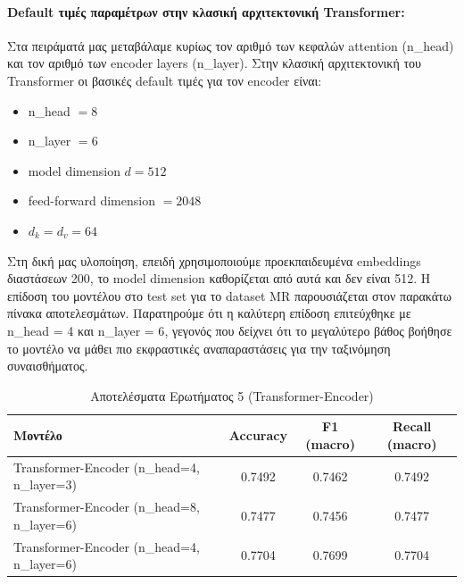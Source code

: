 \documentclass[11pt,a4paper]{article}
\begin{document}
\paragraph{\textlatin{Default} τιμές παραμέτρων στην κλασική αρχιτεκτονική \textlatin{Transformer}:}

Στα πειράματά μας μεταβάλαμε κυρίως τον αριθμό των κεφαλών \textlatin{attention} (\textlatin{n\_head}) και τον αριθμό των \textlatin{encoder layers} 
(\textlatin{n\_layer}). Στην κλασική αρχιτεκτονική του \textlatin{Transformer} οι βασικές \textlatin{default} τιμές 
για τον \textlatin{encoder} είναι:
\begin{itemize}
  \item \textlatin{n\_head} \(= 8\)
  \item \textlatin{n\_layer} \(= 6\)
  \item \textlatin{model dimension} \(d = 512\)
  \item \textlatin{feed-forward dimension} \(= 2048\)
  \item \(d_k = d_v = 64\)
\end{itemize}

Στη δική μας υλοποίηση, επειδή χρησιμοποιούμε προεκπαιδευμένα \textlatin{embeddings} διαστάσεων 200, το \textlatin{model dimension} καθορίζεται 
από αυτά και δεν είναι 512. Η επίδοση του μοντέλου στο \textlatin{test set} για το \textlatin{dataset MR} παρουσιάζεται στον παρακάτω πίνακα 
αποτελεσμάτων. Παρατηρούμε ότι η καλύτερη επίδοση επιτεύχθηκε με \textlatin{n\_head = 4} και \textlatin{n\_layer = 6}, γεγονός που δείχνει ότι 
το μεγαλύτερο βάθος βοήθησε το μοντέλο να μάθει πιο εκφραστικές αναπαραστάσεις για την ταξινόμηση συναισθήματος.

\begin{table}[H]
  \centering
  \caption{Αποτελέσματα Ερωτήματος 5 (\textlatin{Transformer-Encoder})}
  \begin{tabular}{lccc}
    \toprule
    \textbf{Μοντέλο} & \textbf{\textlatin{Accuracy}} & \textbf{\textlatin{F1 (macro)}} & \textbf{\textlatin{Recall (macro)}} \\
    \midrule
    \textlatin{Transformer-Encoder (n\_head=4, n\_layer=3)} & 0.7492 & 0.7462 & 0.7492 \\
    \textlatin{Transformer-Encoder (n\_head=8, n\_layer=6)} & 0.7477 & 0.7456 & 0.7477 \\
    \textlatin{Transformer-Encoder (n\_head=4, n\_layer=6)} & 0.7704 & 0.7699 & 0.7704 \\
    \bottomrule
  \end{tabular}
\end{table}
\end{document}
